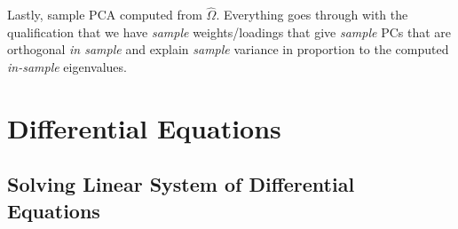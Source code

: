 \documentclass[12pt]{article}
\numberwithin{equation}{section} %
\theoremstyle{plain}
\theoremstyle{definition}
\theoremstyle{remark}
\begin{document}
Lastly, sample PCA computed from $\hat{\Omega}$.
Everything goes through with the qualification
that we have \emph{sample} weights/loadings that give \emph{sample} PCs
that are orthogonal \emph{in sample} and explain \emph{sample} variance
in proportion to the computed \emph{in-sample} eigenvalues.



\clearpage
\section{Differential Equations}

\subsection{Solving Linear System of Differential Equations}
\end{document}
